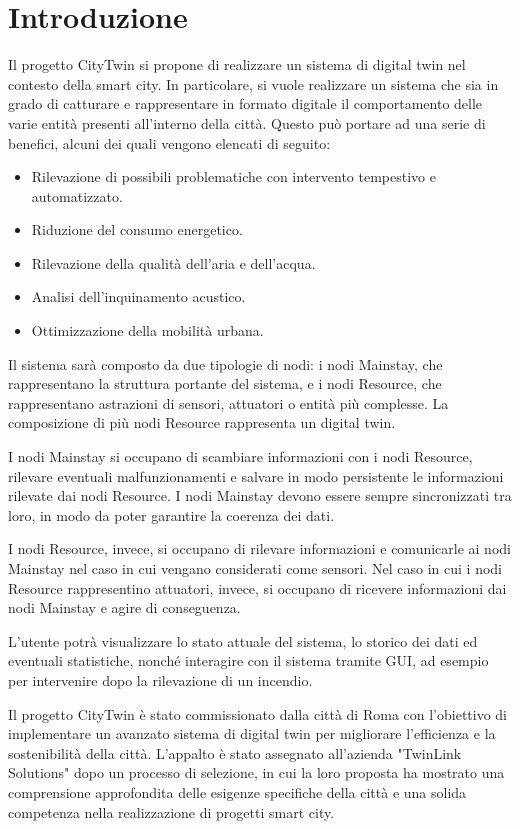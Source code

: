 \chapter{Introduzione}
Il progetto CityTwin si propone di realizzare un sistema di digital twin nel contesto della smart city. In particolare, si vuole realizzare un sistema che sia in grado di catturare e rappresentare in formato digitale il comportamento delle varie entità presenti all'interno della città. Questo può portare ad una serie di benefici, alcuni dei quali vengono elencati di seguito:

\begin{itemize}
    \item Rilevazione di possibili problematiche con intervento tempestivo e automatizzato.
    \item Riduzione del consumo energetico.
    \item Rilevazione della qualità dell'aria e dell'acqua.
    \item Analisi dell'inquinamento acustico.
    \item Ottimizzazione della mobilità urbana.
\end{itemize}

Il sistema sarà composto da due tipologie di nodi: i nodi Mainstay, che rappresentano la struttura portante del sistema, e i nodi Resource, che rappresentano astrazioni di sensori, attuatori o entità più complesse. La composizione di più nodi Resource rappresenta un digital twin.

I nodi Mainstay si occupano di scambiare informazioni con i nodi Resource, rilevare eventuali malfunzionamenti e salvare in modo persistente le informazioni rilevate dai nodi Resource. I nodi Mainstay devono essere sempre sincronizzati tra loro, in modo da poter garantire la coerenza dei dati.

I nodi Resource, invece, si occupano di rilevare informazioni e comunicarle ai nodi Mainstay nel caso in cui vengano considerati come sensori. Nel caso in cui i nodi Resource rappresentino attuatori, invece, si occupano di ricevere informazioni dai nodi Mainstay e agire di conseguenza.

L'utente potrà visualizzare lo stato attuale del sistema, lo storico dei dati ed eventuali statistiche, nonché interagire con il sistema tramite GUI, ad esempio per intervenire dopo la rilevazione di un incendio.

Il progetto CityTwin è stato commissionato dalla città di Roma con l'obiettivo di implementare un avanzato sistema di digital twin per migliorare l'efficienza e la sostenibilità della città. L'appalto è stato assegnato all'azienda "TwinLink Solutions" dopo un processo di selezione, in cui la loro proposta ha mostrato una comprensione approfondita delle esigenze specifiche della città e una solida competenza nella realizzazione di progetti smart city.

